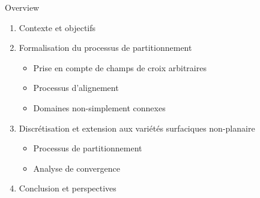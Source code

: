 \documentclass[compress,10pt,aspectratio=169]{beamer}
\begin{document}
\begin{frame}{Overview}
    \vspace{-0.4cm}
    \begin{enumerate}
        \item \color{onera} Contexte et objectifs \\\vspace{0.34cm}
        \item Formalisation du processus de partitionnement %
        \vspace{0.32cm}
        \begin{itemize}
            \item Prise en compte de champs de croix arbitraires\\\vspace{0.2cm}
            \item Processus d'alignement\\\vspace{0.2cm}
            \item Domaines non-simplement connexes\\\vspace{0.2cm}
        \end{itemize}
        \item Discrétisation et extension aux variétés surfaciques non-planaire %
        \vspace{0.32cm}
        \begin{itemize}
            \item Processus de partitionnement\\\vspace{0.2cm}
            \item Analyse de convergence\\\vspace{0.2cm}
        \end{itemize}
        \item Conclusion et perspectives
    \end{enumerate}
\end{frame}
\end{document}

